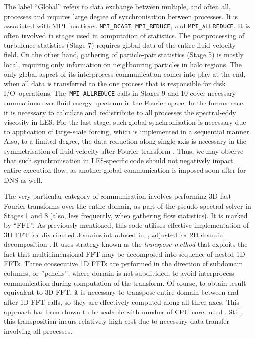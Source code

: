 \documentclass{pracamgren}
\begin{document}
The label ``Global'' refers to data exchange between multiple, and often all, processes and requires large degree of synchronisation between processes.
It is associated with MPI functions: \texttt{MPI\_BCAST}, \texttt{MPI\_REDUCE}, and \texttt{MPI\_ALLREDUCE}.
It is often involved in stages used in computation of statistics.
The postprocessing of turbulence statistics (Stage 7) requires global data of the entire fluid velocity field.
On the other hand, gathering of particle-pair statistics (Stage 5) is mostly local, requiring only information on neighbouring particles in halo regions.
The only global aspect of its interprocess communication comes into play at the end, when all data is transferred to the one process that is responsible for disk I/O~operations.
The~\texttt{MPI\_ALLREDUCE} calls in Stages 9 and 10 cover necessary summations over fluid energy spectrum in the Fourier space.
In the former case, it is necessary to calculate and~redistribute to all processes the spectral-eddy viscosity in LES.
For the last stage, such global synchronisation is necessary due to application of large-scale forcing, which is implemented in a sequential manner.
Also, to a limited degree, the data reduction along single axis is necessary in the symmetrisation of fluid velocity after Fourier transform \parencite{Ayala2014}. 
Thus, we may observe that such synchronisation in LES-specific code should not negatively impact entire execution flow, as another global communication is imposed soon after for DNS as well. 

The very particular category of communication involves performing 3D fast Fourier transforms over the entire domain, as part of the pseudo-spectral solver in Stages 1 and 8 (also, less frequently, when gathering flow statistics).
It is marked by ``FFT''.
As previously mentioned, this code utilises effective implementation of 3D FFT for distributed domains introduced in~\textcite{Dmitruk2001}, adjusted for 2D domain decomposition \parencite{Ayala2013}.
It uses strategy known as the \emph{transpose method} that exploits the fact that multidimensional FFT may be decomposed into sequence of nested 1D FFTs.
Three consecutive 1D FFTs are performed in the direction of subdomain columns, or ''pencils'', where domain is not subdivided, to avoid interprocess communication during computation of the transform.
Of course, to obtain result equivalent to 3D FFT, it is necessary to transpose entire domain between and after 1D FFT calls, so they are effectively computed along all three axes.
This approach has been shown to be scalable with number of CPU cores used \parencite{Dmitruk2001,Ayala2013}.
Still, this transposition incurs relatively high cost due to necessary data transfer involving all processes.
\end{document}
